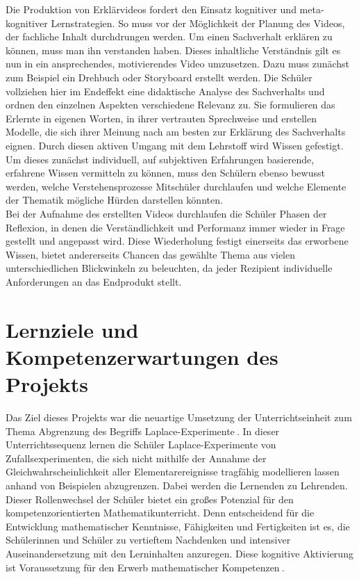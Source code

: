 \documentclass[a4paper,12pt,twoside=false]{scrartcl}
\begin{document}
Die Produktion von Erklärvideos fordert den Einsatz kognitiver und meta-kognitiver Lernstrategien. So muss vor der Möglichkeit der Planung des Videos, der fachliche Inhalt durchdrungen werden. Um einen Sachverhalt erklären zu können, muss man ihn verstanden haben. Dieses inhaltliche Verständnis gilt es nun in ein ansprechendes, motivierendes Video umzusetzen. Dazu muss zunächst zum Beispiel ein Drehbuch oder Storyboard erstellt werden. Die Schüler vollziehen hier im Endeffekt eine didaktische Analyse des Sachverhalts und ordnen den einzelnen Aspekten verschiedene Relevanz zu. Sie formulieren das Erlernte in eigenen Worten, in ihrer vertrauten Sprechweise und erstellen Modelle, die sich ihrer Meinung nach am besten zur Erklärung des Sachverhalts eignen. Durch diesen aktiven Umgang mit dem Lehrstoff wird Wissen gefestigt. Um dieses zunächst individuell, auf subjektiven Erfahrungen basierende, erfahrene Wissen vermitteln zu können, muss den Schülern ebenso bewusst werden, welche Verstehensprozesse Mitschüler durchlaufen und welche Elemente der Thematik mögliche Hürden darstellen könnten. \\ 
Bei der Aufnahme des erstellten Videos durchlaufen die Schüler Phasen der Reflexion, in denen die Verständlichkeit und Performanz immer wieder in Frage gestellt und angepasst wird. Diese Wiederholung festigt einerseits das erworbene Wissen, bietet andererseits Chancen das gewählte Thema aus vielen unterschiedlichen Blickwinkeln zu beleuchten, da jeder Rezipient individuelle Anforderungen an das Endprodukt stellt. 

\section{Lernziele und Kompetenzerwartungen des Projekts}

Das Ziel dieses Projekts war die neuartige Umsetzung der Unterrichtseinheit zum Thema \glqq Abgrenzung des Begriffs Laplace-Experimente\grqq $~$. In dieser Unterrichtssequenz lernen die Schüler Laplace-Experimente von Zufallsexperimenten, die sich nicht mithilfe der Annahme der Gleichwahrscheinlichkeit aller Elementarereignisse tragfähig modellieren lassen anhand von Beispielen abzugrenzen. Dabei werden die Lernenden zu Lehrenden. Dieser Rollenwechsel  der Schüler bietet ein großes Potenzial für den kompetenzorientierten Mathematikunterricht. Denn entscheidend \glqq für die Entwicklung mathematischer Kenntnisse, Fähigkeiten und Fertigkeiten ist es, die Schülerinnen und Schüler zu vertieftem Nachdenken und intensiver Auseinandersetzung mit den Lerninhalten anzuregen. Diese kognitive Aktivierung ist Voraussetzung für den Erwerb mathematischer Kompetenzen\grqq$~$.\cite{LehrplanPlus}
\end{document}
